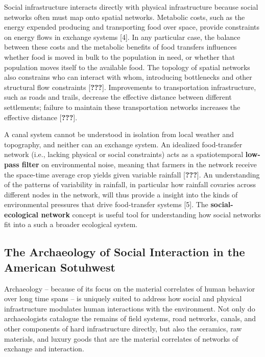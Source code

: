 \documentclass[10pt,letterpaper]{article}
\begin{document}
Social infrastructure interacts directly with physical infrastructure
because social networks often must map onto spatial networks. Metabolic
costs, such as the energy expended producing and transporting food over
space, provide constraints on energy flows in exchange systems {[}4{]}.
In any particular case, the balance between these costs and the
metabolic benefits of food transfers influences whether food is moved in
bulk to the population in need, or whether that population moves itself
to the available food. The topology of spatial networks also constrains
who can interact with whom, introducing bottlenecks and other structural
flow constraints {[}{\textbf{???}}{]}. Improvements to transportation
infrastructure, such as roads and trails, decrease the effective
distance between different settlements; failure to maintain these
transportation networks increases the effective distance
{[}{\textbf{???}}{]}.

A canal system cannot be understood in isolation from local weather and
topography, and neither can an exchange system. An idealized
food-transfer network (i.e., lacking physical or social constraints)
acts as a spatiotemporal \textbf{low-pass filter} on environmental
noise, meaning that farmers in the network receive the space-time
average crop yields given variable rainfall {[}{\textbf{???}}{]}. An
understanding of the patterns of variability in rainfall, in particular
how rainfall covaries across different nodes in the network, will thus
provide a insight into the kinds of environmental pressures that drive
food-transfer systems {[}5{]}. The \textbf{social-ecological network}
concept is useful tool for understanding how social networks fit into a
such a broader ecological system.

\subsection{The Archaeology of Social Interaction in the American
Sotuhwest}\label{the-archaeology-of-social-interaction-in-the-american-sotuhwest}

Archaeology -- because of its focus on the material correlates of human
behavior over long time spans -- is uniquely suited to address how
social and physical infrastructure modulates human interactions with the
environment. Not only do archaeologists catalogue the remains of field
systems, road networks, canals, and other components of hard
infrastructure directly, but also the ceramics, raw materials, and
luxury goods that are the material correlates of networks of exchange
and interaction.
\end{document}
